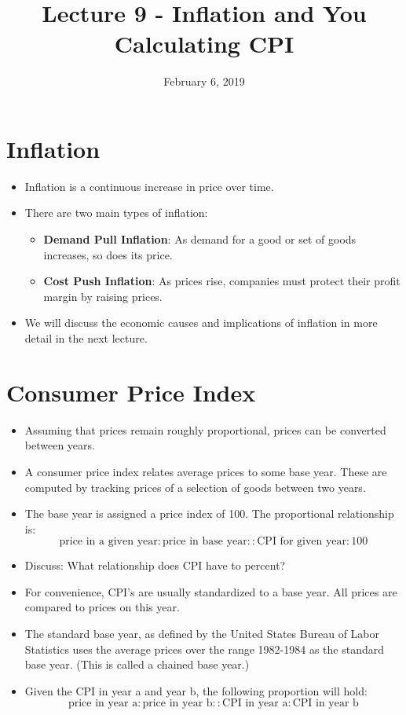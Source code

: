 \documentclass{article}
\title{Lecture 9 - Inflation and You Calculating CPI}
\author{}
\date{February 6, 2019}
\begin{document}
\maketitle
\section*{Inflation}
\begin{itemize}
\item Inflation is a continuous increase in price over time.
\item There are two main types of inflation:
    \begin{itemize}
    \item {\bf Demand Pull Inflation}: As demand for a good or set of goods increases, 
       so does its price.
    \item {\bf Cost Push Inflation}: As prices rise, companies must protect their profit
       margin by raising prices.
    \end{itemize}
\item We will discuss the economic causes and implications of inflation in more detail 
  in the next lecture.
\end{itemize}

\section*{Consumer Price Index}
\begin{itemize}
\item Assuming that prices remain roughly proportional, prices can be converted between years.
\item A consumer price index relates average prices to some base year.  These are computed by tracking prices of a selection of goods between two years.
\item The base year is assigned a price index of 100.  The proportional relationship is:
\[
\textrm{price in a given year} : \textrm{price in base year} :: \textrm{CPI for given year} : 100 
\]
\item Discuss:  What relationship does CPI have to percent?
\item For convenience, CPI's are usually standardized to a base year.  All prices are compared to prices on this year.
\item The standard base year, as defined by the United States Bureau of Labor Statistics uses the average prices over the range 1982-1984 as the standard base year.  (This is called a chained base year.)
\item Given the CPI in year a and year b, the following proportion will hold:
\[
\textrm{price in year a} : \textrm{price in year b} :: \textrm{CPI in year a} : \textrm{CPI in year b}
\]
\end{itemize}
\end{document}
